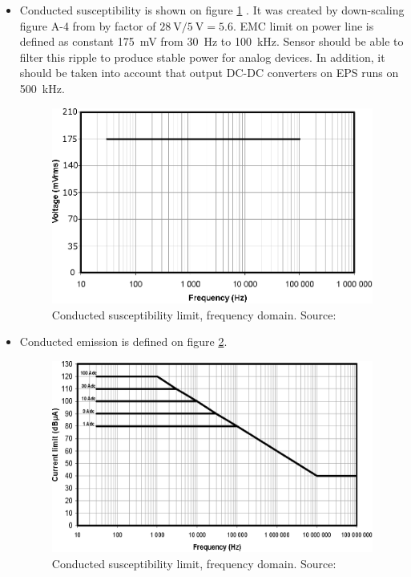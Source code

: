     \begin{itemize}
        \item Conducted susceptibility is shown on figure \ref{EMC_conducted_susceptibility} . It was created by down-scaling figure A-4 from \cite{ECSS_E_ST_20_07C} by factor of $\SI{28}{\volt}/\SI{5}{\volt} = 5.6$. EMC limit on power line is defined as constant \SI{175}{\milli\volt} from \SI{30}{\hertz} to \SI{100}{\kilo\hertz}. Sensor should be able to filter this ripple to produce stable power for analog devices. In addition, it should be taken into account that output DC-DC converters on EPS runs on \SI{500}{\kilo\hertz}.

        \begin{figure}[H]
            \centering
            \includegraphics[width=0.5\paperwidth]{img/EMC_conducted_susceptibility.eps}
            \caption{Conducted susceptibility limit, frequency domain. Source: \cite{ECSS_E_ST_20_07C}}
            \label{EMC_conducted_susceptibility}
        \end{figure}


        \item Conducted emission is defined on figure \ref{EMC_conducted_emission}.

        \begin{figure}[H]
            \centering
            \includegraphics[width=0.5\paperwidth]{img/EMC_conducted_emission.eps}
            \caption{Conducted susceptibility limit, frequency domain. Source: \cite{ECSS_E_ST_20_07C}}
            \label{EMC_conducted_emission}
        \end{figure}    



\end{itemize}
